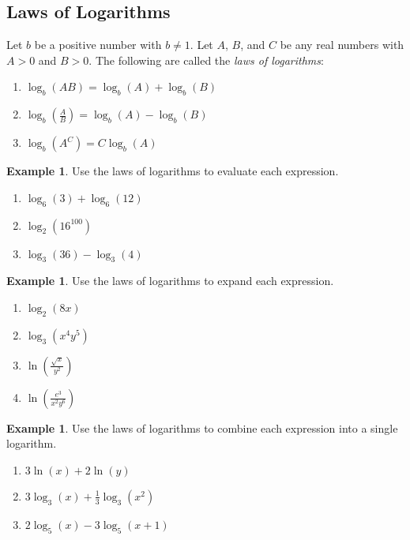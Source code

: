 \documentclass[letterpaper,12pt,oneside]{book}
\theoremstyle{definition}
\newtheorem{example}[theorem]{Example}
\newcommand{\dsp}{\displaystyle}
\begin{document}
{\subsection*{Laws of Logarithms}

Let $b$ be a positive number with $b\neq 1$.  Let $A$, $B$, and $C$ be any real numbers with $A>0$ and $B>0$.  The following are called the \emph{laws of logarithms}:
\begin{enumerate}[label=\arabic*.]
\item $\log_b(AB)=\log_b(A)+\log_b(B)$
\item $\dsp\log_b\left(\frac{A}{B}\right)=\log_b(A)-\log_b(B)$
\item $\log_b(A^C)=C\log_b(A)$
\end{enumerate}

\begin{example}
Use the laws of logarithms to evaluate each expression.
\begin{enumerate}
\item $\log_6(3)+\log_6(12)$
\vfill
\item $\log_2(16^{100})$
\vfill
\item $\log_3(36)-\log_3(4)$
\vfill
\end{enumerate}
\end{example}

\newpage

\begin{example}
Use the laws of logarithms to expand each expression.
\begin{enumerate}
\item $\log_2(8x)$
\vfill
\item $\log_3\left(x^4y^5\right)$
\vfill
\item $\dsp\ln\left(\frac{\sqrt{x}}{y^2}\right)$
\vfill
\item $\dsp\ln\left(\frac{e^3}{x^2y^6}\right)$
\vfill
\end{enumerate}
\end{example}

\begin{example}
Use the laws of logarithms to combine each expression into a single logarithm.
\begin{enumerate}
\item $3\ln(x)+2\ln(y)$
\vfill
\item $3\log_3(x)+\frac{1}{3}\log_3(x^2)$
\vfill
\item $2\log_5(x)-3\log_5(x+1)$
\vfill
\end{enumerate}
\end{example}

}
\end{document}
